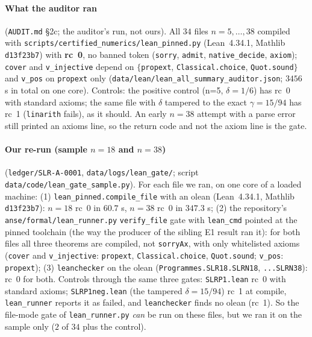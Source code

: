 \documentclass[10pt]{article}
\newcommand{\lean}[1]{\texttt{#1}}
\begin{document}
\paragraph{What the auditor ran} (\texttt{AUDIT.md} \S2c; the auditor's run, not ours). All $34$ files $n=5,\dots,38$ compiled with \texttt{scripts/certified\_numerics/lean\_pinned.py} (Lean~4.34.1, Mathlib \texttt{d13f23b7}) with \textbf{rc~0}, no banned token (\texttt{sorry}, \texttt{admit}, \texttt{native\_decide}, \texttt{axiom}); \lean{cover} and \lean{v\_injective} depend on $\{$\lean{propext}, \lean{Classical.choice}, \lean{Quot.sound}$\}$ and \lean{v\_pos} on \lean{propext} only (\texttt{data/lean/lean\_all\_summary\_auditor.json}; $3456$ s in total on one core). Controls: the positive control (n=5, $\delta=1/6$) has rc~0 with standard axioms; the same file with $\delta$ tampered to the exact $\gamma=15/94$ has rc~1 (\texttt{linarith} fails), as it should. An early $n=38$ attempt with a parse error still printed an axioms line, so the return code and not the axiom line is the gate.
\paragraph{Our re-run (sample $n=18$ and $n=38$)} (\texttt{ledger/SLR-A-0001}, \texttt{data/logs/lean\_gate/}; script \texttt{data/code/lean\_gate\_sample.py}). For each file we ran, on one core of a loaded machine: (1) \texttt{lean\_pinned.compile\_file} with an olean (Lean~4.34.1, Mathlib \texttt{d13f23b7}): $n=18$ rc~0 in $60.7$ s, $n=38$ rc~0 in $347.3$ s; (2) the repository's \texttt{anse/formal/lean\_runner.py} \texttt{verify\_file} gate with \texttt{lean\_cmd} pointed at the pinned toolchain (the way the producer of the sibling E1 result ran it): for both files all three theorems are compiled, not \lean{sorryAx}, with only whitelisted axioms (\lean{cover} and \lean{v\_injective}: \lean{propext}, \lean{Classical.choice}, \lean{Quot.sound}; \lean{v\_pos}: \lean{propext}); (3) \texttt{leanchecker} on the olean (\texttt{Programmes.SLR18.SLRN18}, \texttt{...SLRN38}): rc~0 for both. Controls through the same three gates: \texttt{SLRP1.lean} rc~0 with standard axioms; \texttt{SLRP1neg.lean} (the tampered $\delta=15/94$) rc~1 at compile, \texttt{lean\_runner} reports it as failed, and \texttt{leanchecker} finds no olean (rc~1). So the file-mode gate of \texttt{lean\_runner.py} \emph{can} be run on these files, but we ran it on the sample only ($2$ of $34$ plus the control).
\end{document}
